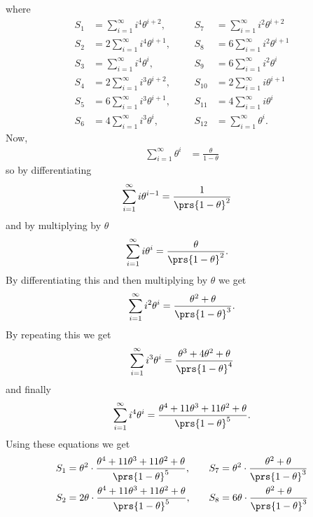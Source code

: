 \documentclass[10pt]{article}
\theoremstyle{definition}
\begin{document}
\begin{enumerate}
where
\begin{align*}
S_1 &= \sum_{i=1}^{\infty} i^4 \theta^{i+2}, & & & S_7 &= \sum_{i=1}^{\infty} i^2 \theta^{i+2}
\\ 
S_2 &= 2 \sum_{i=1}^{\infty} i^4 \theta^{i+1}, & & &  S_8 &= 6 \sum_{i=1}^{\infty} i^2 \theta^{i+1}
\\
S_3 &= \sum_{i=1}^{\infty} i^4 \theta^i, & & &  S_9 &= 6 \sum_{i=1}^{\infty} i^2 \theta^i
\\
S_4 &= 2 \sum_{i=1}^{\infty} i^3 \theta^{i+2}, & & &  S_{10} &= 2 \sum_{i=1}^{\infty} i \theta^{i+1}
\\
S_5 &= 6 \sum_{i=1}^{\infty} i^3 \theta^{i+1}, & & &  S_{11} &= 4 \sum_{i=1}^{\infty} i \theta^i
\\
S_6 &= 4 \sum_{i=1}^{\infty} i^3 \theta^i, & & &  S_{12} &= \sum_{i=1}^{\infty} \theta^i \text{.}
\end{align*}
Now,
\begin{align*}
\sum_{i = 1}^{\infty} \theta^i &= \frac{\theta}{1 - \theta}
\end{align*}
so by differentiating
\begin{align*}
\sum_{i=1}^{\infty} i \theta^{i-1} &= \frac{1}{\prs{1 - \theta}^2}
\end{align*}
and by multiplying by $\theta$
\begin{align*}
\sum_{i=1}^{\infty} i \theta^i &= \frac{\theta}{\prs{1 - \theta}^2} \text{.}
\end{align*}
By differentiating this and then multiplying by $\theta$ we get
\begin{align*}
\sum_{i=1}^{\infty} i^2 \theta^i = \frac{\theta^2 + \theta}{\prs{1-\theta}^3} \text{.}
\end{align*}
By repeating this we get
\begin{align*}
\sum_{i=1}^{\infty} i^3 \theta^i = \frac{\theta^3 + 4\theta^2 + \theta}{\prs{1-\theta}^4}
\end{align*}
and finally
\begin{align*}
\sum_{i=1}^{\infty} i^4 \theta^i = \frac{\theta^4 + 11 \theta^3 + 11\theta^2 + \theta}{\prs{1-\theta}^5} \text{.}
\end{align*}
Using these equations we get
\begin{align*}
S_1 &= \theta^2 \cdot \frac{\theta^4 + 11 \theta^3 + 11\theta^2 + \theta}{\prs{1-\theta}^5}, & & & S_7 &= \theta^2 \cdot \frac{\theta^2 + \theta}{\prs{1-\theta}^3}
\\ 
S_2 &= 2 \theta \cdot \frac{\theta^4 + 11 \theta^3 + 11\theta^2 + \theta}{\prs{1-\theta}^5}, & & &  S_8 &= 6 \theta \cdot \frac{\theta^2 + \theta}{\prs{1-\theta}^3}

\end{align*}
\end{enumerate}
\end{document}
